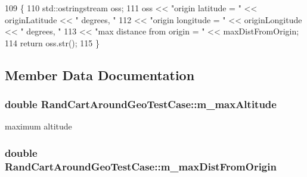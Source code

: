 \begin{DoxyCode}
109 \{
110   std::ostringstream oss;
111   oss << \textcolor{stringliteral}{"origin latitude = "} << originLatitude << \textcolor{stringliteral}{" degrees, "}
112       << \textcolor{stringliteral}{"origin longitude = "} << originLongitude << \textcolor{stringliteral}{" degrees, "}
113       << \textcolor{stringliteral}{"max distance from origin = "} << maxDistFromOrigin;
114   \textcolor{keywordflow}{return} oss.str();
115 \}
\end{DoxyCode}


\subsection{Member Data Documentation}
\subsubsection[{\texorpdfstring{m\+\_\+max\+Altitude}{m_maxAltitude}}]{\setlength{\rightskip}{0pt plus 5cm}double Rand\+Cart\+Around\+Geo\+Test\+Case\+::m\+\_\+max\+Altitude\hspace{0.3cm}{\ttfamily [private]}}\hypertarget{classRandCartAroundGeoTestCase_a0bbb663d7430e385fcb8edd28ea89618}{}\label{classRandCartAroundGeoTestCase_a0bbb663d7430e385fcb8edd28ea89618}


maximum altitude 

\subsubsection[{\texorpdfstring{m\+\_\+max\+Dist\+From\+Origin}{m_maxDistFromOrigin}}]{\setlength{\rightskip}{0pt plus 5cm}double Rand\+Cart\+Around\+Geo\+Test\+Case\+::m\+\_\+max\+Dist\+From\+Origin\hspace{0.3cm}{\ttfamily [private]}}\hypertarget{classRandCartAroundGeoTestCase_ae853512eccb51970f0dd3857e5e1aed8}{}\label{classRandCartAroundGeoTestCase_ae853512eccb51970f0dd3857e5e1aed8}


